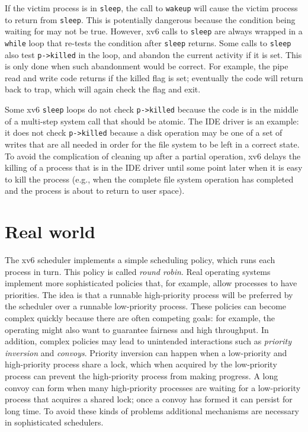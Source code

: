 If the victim process is in
\lstinline{sleep},
the call to
\lstinline{wakeup}
will cause the victim process to return from
\lstinline{sleep}.
This is potentially dangerous because 
the condition being waiting for may not be true.
However, xv6 calls to
\lstinline{sleep}
are always wrapped in a
\lstinline{while}
loop that re-tests the condition after
\lstinline{sleep}
returns.
Some calls to
\lstinline{sleep}
also test
\lstinline{p->killed}
in the loop, and abandon the current activity if it is set.
This is only done when such abandonment would be correct.
For example, the pipe read and write code
returns if the killed flag is set; eventually the
code will return back to trap, which will again
check the flag and exit.

Some xv6 
\lstinline{sleep}
loops do not check
\lstinline{p->killed} 
because the code is in the middle of a multi-step
system call that should be atomic.
The IDE driver
is an example: it does not check
\lstinline{p->killed}
because a disk operation may be one of a set of
writes that are all needed in order for the file system to
be left in a correct state.
To avoid the complication of cleaning up after a partial operation, xv6 delays
the killing of a process that is in the IDE driver until some point later when
it is easy to kill the process (e.g., when the complete file system operation
has completed and the process is about to return to user space).
\section{Real world}

The xv6 scheduler implements a simple scheduling policy, which runs each process
in turn.  This policy is called
\textit{round robin}.
Real operating systems implement more sophisticated policies that, for example,
allow processes to have priorities.  The idea is that a runnable high-priority process
will be preferred by the scheduler over a runnable low-priority process.   These
policies can become complex quickly because there are often competing goals: for
example, the operating might also want to guarantee fairness and
high throughput.  In addition, complex policies may lead to unintended
interactions such as
\textit{priority inversion}
and 
\textit{convoys}.
Priority inversion can happen when a low-priority and high-priority process
share a lock, which when acquired by the low-priority process can prevent the
high-priority process from making progress.  A long convoy can form when many
high-priority processes are waiting for a low-priority process that acquires a
shared lock; once a convoy has formed it can persist for long time.
To avoid these kinds of problems additional mechanisms are necessary in
sophisticated schedulers.

